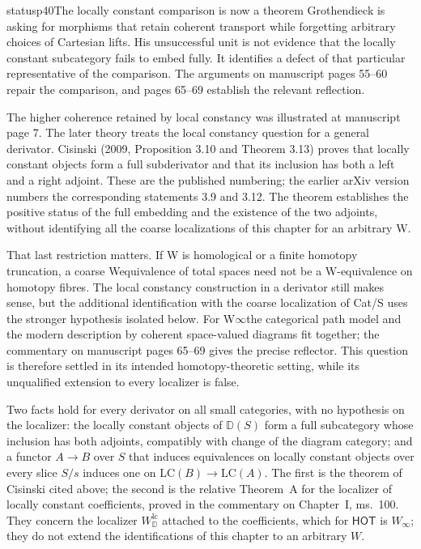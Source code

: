 \begin{dcomment}{status}{p40}{The locally constant comparison is now a theorem}
Grothendieck is asking for morphisms that retain coherent transport while forgetting arbitrary choices of Cartesian lifts. His unsuccessful unit is not evidence that the locally constant subcategory fails to embed fully. It identifies a defect of that particular representative of the comparison. The arguments on manuscript pages 55--60 repair the comparison, and pages 65--69 establish the relevant reflection.

The higher coherence retained by local constancy was illustrated at manuscript page 7. The later theory treats the local constancy question for a general derivator. Cisinski (2009, Proposition 3.10 and Theorem 3.13) proves that locally constant objects form a full subderivator and that its inclusion has both a left and a right adjoint. These are the published numbering; the earlier arXiv version numbers the corresponding statements 3.9 and 3.12. The theorem establishes the positive status of the full embedding and the existence of the two adjoints, without identifying all the coarse localizations of this chapter for an arbitrary W.

That last restriction matters. If W is homological or a finite homotopy truncation, a coarse Wequivalence of total spaces need not be a W-equivalence on homotopy fibres. The local constancy construction in a derivator still makes sense, but the additional identification with the coarse localization of Cat/S uses the stronger hypothesis isolated below. For W\ensuremath{\infty}the categorical path model and the modern description by coherent space-valued diagrams fit together; the commentary on manuscript pages 65--69 gives the precise reflector. This question is therefore settled in its intended homotopy-theoretic setting, while its unqualified extension to every localizer is false.

Two facts hold for every derivator on all small categories, with no hypothesis on the localizer: the locally constant objects of $\mathbb D(S)$ form a full subcategory whose inclusion has both adjoints, compatibly with change of the diagram category; and a functor $A\to B$ over $S$ that induces equivalences on locally constant objects over every slice $S/s$ induces one on $\mathrm{LC}(B)\to\mathrm{LC}(A)$. The first is the theorem of Cisinski cited above; the second is the relative Theorem~A for the localizer of locally constant coefficients, proved in the commentary on Chapter~I, ms.~100. They concern the localizer $W^{\mathrm{lc}}_{\mathbb D}$ attached to the coefficients, which for $\mathsf{HOT}$ is $W_\infty$; they do not extend the identifications of this chapter to an arbitrary $W$.
\end{dcomment}

